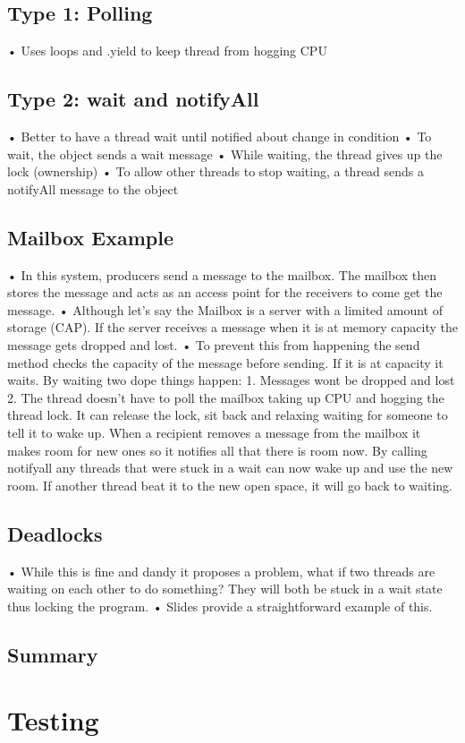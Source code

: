 \documentclass[11pt]{article}
\begin{document}
{{\subsection{Type 1: Polling}
• Uses loops and .yield to keep thread from hogging CPU
\subsection{Type 2: wait and notifyAll}
• Better to have a thread wait until notified about change in condition
• To wait, the object sends a wait message
• While waiting, the thread gives up the lock (ownership)
• To allow other threads to stop waiting, a thread sends a notifyAll message to the object
\subsection{Mailbox Example}
• In this system, producers send a message to the mailbox. The mailbox then stores the message and
acts as an access point for the receivers to come get the message.
• Although let’s say the Mailbox is a server with a limited amount of storage (CAP). If the server
receives a message when it is at memory capacity the message gets dropped and lost.
• To prevent this from happening the send method checks the capacity of the message before
sending. If it is at capacity it waits. By waiting two dope things happen: 1. Messages wont be dropped
and lost 2. The thread doesn't have to poll the mailbox taking up CPU and hogging the thread lock. It
can release the lock, sit back and relaxing waiting for someone to tell it to wake up. 
When a recipient removes a message from the mailbox it makes room for new ones so it notifies all that
there is room now. By calling notifyall any threads that were stuck in a wait can now wake up and use the
new room. If another thread beat it to the new open space, it will go back to waiting.
\subsection{Deadlocks}
• While this is fine and dandy it proposes a problem, what if two threads are waiting on each other to do
something? They will both be stuck in a wait state thus locking the program.
• Slides provide a straightforward example of this.
\subsection{Summary}

\section{Testing}
}}
\end{document}
